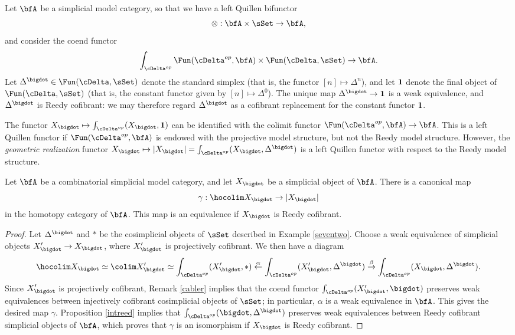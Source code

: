\begin{example}\label{seventwo}
Let $\bfA$ be a simplicial model category, so that we have a left Quillen bifunctor
$$ \otimes: \bfA \times \sSet \rightarrow \bfA,$$
and consider the coend functor
$$ \int_{ \cDelta^{op} } \Fun( \cDelta^{op}, \bfA) \times \Fun( \cDelta, \sSet) \rightarrow \bfA.$$
Let $\Delta^{\bigdot} \in \Fun( \cDelta, \sSet)$ denote the standard simplex
(that is, the functor $[n] \mapsto \Delta^n$), and let ${\bf 1}$ denote the final object
of $\Fun(\cDelta, \sSet)$ (that is, the constant functor given by $[n] \mapsto \Delta^0$).
The unique map $\Delta^{\bigdot} \rightarrow {\bf 1}$ is a weak equivalence, 
and $\Delta^{\bigdot}$ is Reedy cofibrant: we may therefore regard $\Delta^{\bigdot}$ as a cofibrant replacement for the constant functor ${\bf 1}$.

The functor $X_{\bigdot} \mapsto \int_{ \cDelta^{op}}(X_{\bigdot}, {\bf 1})$ can be identified with the colimit functor $\Fun( \cDelta^{op}, \bfA) \rightarrow \bfA$. This is a left Quillen functor if
$\Fun( \cDelta^{op}, \bfA)$ is endowed with the projective model structure, but not the Reedy model structure. However, the {\it geometric realization} functor $X_{\bigdot} \mapsto |X_{\bigdot} | = \int_{ \cDelta^{op}}(X_{\bigdot}, \Delta^{\bigdot})$ is a left Quillen functor with respect to the Reedy model structure. 
\end{example}

\begin{corollary}\label{twinner}
Let $\bfA$ be a combinatorial simplicial model category, and let $X_{\bigdot}$ be a simplicial object
of $\bfA$. There is a canonical map
$$ \gamma: \hocolim X_{\bigdot} \rightarrow | X_{\bigdot} |$$
in the homotopy category of $\bfA$. This map is an equivalence if $X_{\bigdot}$ is Reedy cofibrant.
\end{corollary}

\begin{proof}
Let $\Delta^{\bigdot}$ and $\ast$ be the cosimplicial objects of $\sSet$ described in Example
\ref{seventwo}. Choose a weak equivalence of simplicial objects $X'_{\bigdot} \rightarrow X_{\bigdot}$, where $X'_{\bigdot}$ is projectively cofibrant. We then have a diagram
$$ \hocolim X_{\bigdot} \simeq \colim X'_{\bigdot}
\simeq \int_{ \cDelta^{op}}(X'_{\bigdot}, \ast)
\stackrel{\alpha}{\leftarrow} \int_{ \cDelta^{op}}( X'_{\bigdot}, \Delta^{\bigdot})
\stackrel{\beta}{\rightarrow} \int_{ \cDelta^{op}}( X_{\bigdot}, \Delta^{\bigdot}).$$
Since $X'_{\bigdot}$ is projectively cofibrant, Remark \ref{cabler} implies that the 
coend functor $\int_{\cDelta^{op}}( X'_{\bigdot}, \bigdot)$ preserves weak equivalences between
injectively cofibrant cosimplicial objects of $\sSet$; in particular, $\alpha$ is a weak equivalence in $\bfA$. This gives the desired map $\gamma$. Proposition \ref{intreed} implies that $\int_{ \cDelta^{op}}( \bigdot, \Delta^{\bigdot})$ preserves weak equivalences between Reedy cofibrant simplicial objects of $\bfA$, which proves that $\gamma$ is an isomorphism if $X_{\bigdot}$ is Reedy cofibrant.
\end{proof}

